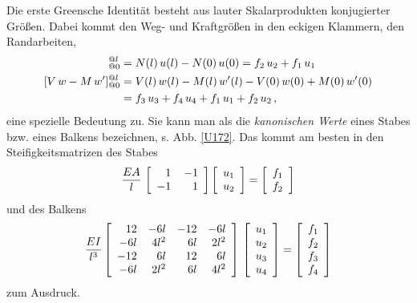 {{{{Die erste Greensche Identit\"{a}t besteht aus lauter Skalarprodukten konjugierter Gr\"{o}{\ss}en. Dabei kommt den Weg- und Kraftgr\"{o}{\ss}en
in den eckigen Klammern, den Randarbeiten,
\begin{align}
[N\,u]_{@0}^{@l} &= N(l)\,u(l) - N(0)\,u(0) = f_2\,u_2 + f_1\,u_1 \\
[V\,w - M\,w']_{@0}^{@l} &= V(l)\,w(l) - M(l)\,w'(l) - V(0)\,w(0) + M(0)\,w'(0)\nn \\
 &= f_3\,u_3 + f_4\,u_4 + f_1\,u_1 + f_2\,u_2\,,
\end{align}
eine spezielle Bedeutung zu. Sie kann man als die {\em kanonischen Werte\/} eines Stabes bzw. eines Balkens bezeichnen, s. Abb. \ref{U172}. Das kommt am besten in den Steifigkeitsmatrizen des Stabes
\begin{align}
\frac{EA}{l}\,\left[ \barr {r @{\hspace{4mm}}r }
      1 & -1  \\
      -1 & 1 \\
     \earr \right]\left [\barr{c}  u_1 \\  u_2\earr \right ]
=  \left [\barr{c}  f_1 \\  f_2 \earr \right ]
\end{align}
und des Balkens
\begin{align}
 \frac{EI}{l^3} \left[
\begin{array}{r r r r}
 12 & -6l & -12 &-6l \\
 -6l & 4l^2 & 6l &2l^2 \\
 -12 & 6l & 12 & 6l \\
 -6l &2l^2 &6l &4l^2
 \end{array}
  \right]\,\left [\barr{c}u_1 \\ u_2 \\ u_3 \\ u_4 \earr \right ] = \left [\barr{c}  f_1 \\ f_2 \\ f_3\\ f_4 \earr \right ]
\end{align}
zum Ausdruck.

}}}}

